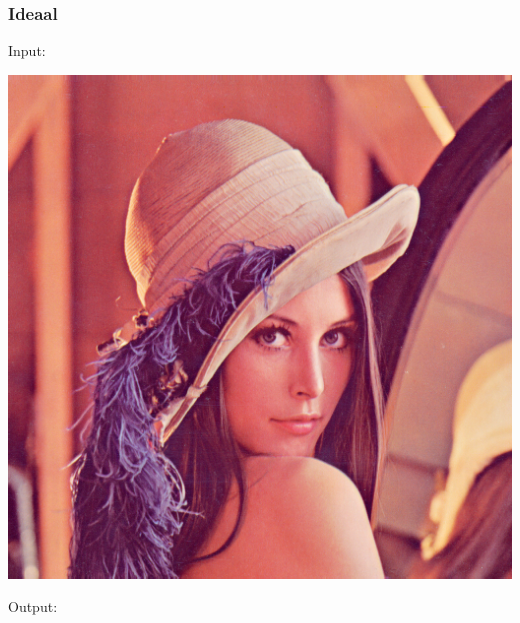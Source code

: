 \documentclass{beamer}
\begin{document}
\begin{frame}
  \frametitle{Ideaal}

  \centering

  Input:

  \includegraphics[scale=.1]{../target.png}

  Output:


\end{frame}
\end{document}
